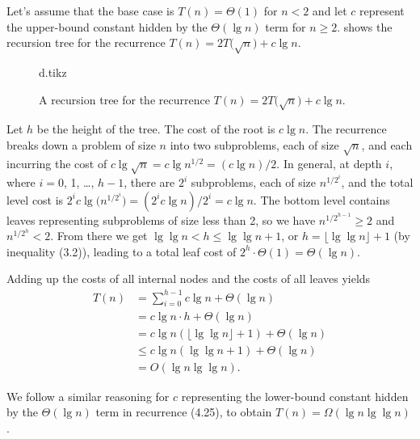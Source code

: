 Let's assume that the base case is $T(n)=\Theta(1)$ for $n<2$ and let $c$ represent the upper-bound constant hidden by the $\Theta(\lg n)$ term for $n\ge2$.
 shows the recursion tree for the recurrence $T(n)=2T\bigl(\sqrt{n}\bigr)+c\lg n$.
\begin{figure}[htb]
    {d.tikz}
    \caption{A recursion tree for the recurrence $T(n)=2T\bigl(\sqrt{n}\bigr)+c\lg n$.} \label{fig:4-3}
\end{figure}

Let $h$ be the height of the tree.
The cost of the root is $c\lg n$.
The recurrence breaks down a problem of size $n$ into two subproblems, each of size $\sqrt{n}$, and each incurring the cost of $c\lg\sqrt{n}=c\lg n^{1/2}=(c\lg n)/2$.
In general, at depth $i$, where $i=0$, 1, \dots, $h-1$, there are $2^i$ subproblems, each of size $n^{1/2^i}$\!, and the total level cost is $2^ic\lg\bigl(n^{1/2^i}\!\bigr)=(2^ic\lg n)/2^i=c\lg n$.
The bottom level contains leaves representing subproblems of size less than 2, so we have $n^{1/2^{h-1}}\!\ge2$ and $n^{1/2^h}\!<2$.
From there we get $\lg\lg n<h\le\lg\lg n+1$, or $h=\lfloor\lg\lg n\rfloor+1$ (by inequality (3.2)), leading to a total leaf cost of $2^h\cdot\Theta(1)=\Theta(\lg n)$.

Adding up the costs of all internal nodes and the costs of all leaves yields
\begin{align*}
    T(n) &= \sum_{i=0}^{h-1}c\lg n+\Theta(\lg n) \\
    &= c\lg n\cdot h+\Theta(\lg n) \\
    &= c\lg n(\lfloor\lg\lg n\rfloor+1)+\Theta(\lg n) \\
    &\le c\lg n(\lg\lg n+1)+\Theta(\lg n) \\
    &= O(\lg n\lg\lg n).
\end{align*}

We follow a similar reasoning for $c$ representing the lower-bound constant hidden by the $\Theta(\lg n)$ term in recurrence (4.25), to obtain $T(n)=\Omega(\lg n\lg\lg n)$.
